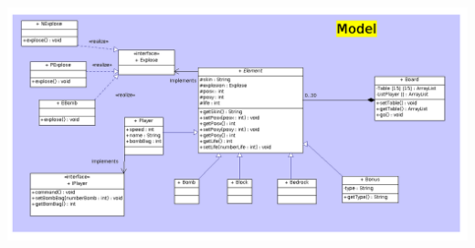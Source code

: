         \begin{center}
		\includegraphics[scale=0.35]{ch1/Model}
 	 	\label{fig:DiagModel}
        \end{center}
        
        
        
        
        
        
        
        
        
        
        
        
        
        
        
        
        
        
        
        
        
        
        
        
        
        
        
        
        
        
		
	


